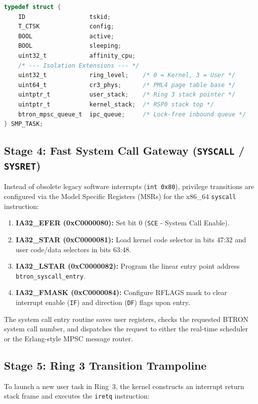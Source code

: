\documentclass[10pt,journal,compsoc,twocolumn]{article}
\begin{document}
\begin{lstlisting}[language=C, caption={Augmented \texttt{SMP\_TASK} structure with isolation metadata.}]
typedef struct {
    ID                  tskid;
    T_CTSK              config;
    BOOL                active;
    BOOL                sleeping;
    uint32_t            affinity_cpu;
    /* --- Isolation Extensions --- */
    uint32_t            ring_level;    /* 0 = Kernel, 3 = User */
    uint64_t            cr3_phys;      /* PML4 page table base */
    uintptr_t           user_stack;    /* Ring 3 stack pointer */
    uintptr_t           kernel_stack;  /* RSP0 stack top */
    btron_mpsc_queue_t  ipc_queue;     /* Lock-free inbound queue */
} SMP_TASK;
\end{lstlisting}

\subsection{Stage 4: Fast System Call Gateway (\texttt{SYSCALL} / \texttt{SYSRET})}
Instead of obsolete legacy software interrupts (\texttt{int 0x80}), privilege transitions are configured via the Model Specific Registers (MSRs) for the x86\_64 \texttt{syscall} instruction:
\begin{enumerate}[leftmargin=*]
    \item \textbf{IA32\_EFER (0xC0000080):} Set bit 0 (\texttt{SCE} - System Call Enable).
    \item \textbf{IA32\_STAR (0xC0000081):} Load kernel code selector in bits 47:32 and user code/data selectors in bits 63:48.
    \item \textbf{IA32\_LSTAR (0xC0000082):} Program the linear entry point address \texttt{btron\_syscall\_entry}.
    \item \textbf{IA32\_FMASK (0xC0000084):} Configure RFLAGS mask to clear interrupt enable (\texttt{IF}) and direction (\texttt{DF}) flags upon entry.
\end{enumerate}

The system call entry routine saves user registers, checks the requested BTRON system call number, and dispatches the request to either the real-time scheduler or the Erlang-style MPSC message router.

\subsection{Stage 5: Ring 3 Transition Trampoline}
To launch a new user task in Ring~3, the kernel constructs an interrupt return stack frame and executes the \texttt{iretq} instruction:
\end{document}
